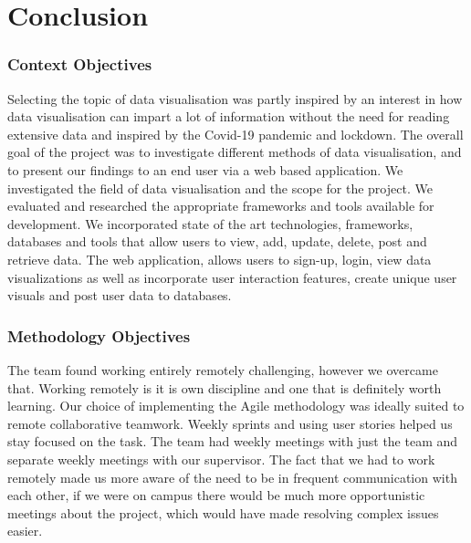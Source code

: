 \chapter{Conclusion}

\subsection{Context Objectives }
Selecting the topic of data visualisation was partly inspired by an interest in how data visualisation can impart a lot of information without the need for reading extensive data and inspired by the Covid-19 pandemic and lockdown.
The overall goal of the project was to investigate different methods of data visualisation, and to present our findings to an end user via a web based application.
We investigated the field of data visualisation and the scope for the project.
We evaluated and researched the appropriate frameworks and tools available for development.
We incorporated state of the art technologies, frameworks, databases and tools that allow users to view, add, update, delete, post and retrieve data.
The web application, allows users to sign-up, login, view data visualizations as well as incorporate user interaction features, create unique user visuals and post user data to databases.




\subsection{Methodology Objectives}
The team found working entirely remotely challenging, however we overcame that. Working remotely is it is own discipline and one that is definitely worth learning. Our choice of implementing the Agile methodology was ideally suited to remote collaborative teamwork. Weekly sprints and using user stories helped us stay focused on the task. The team had weekly meetings with just the team and separate weekly meetings with our supervisor. The fact that we had to work remotely made us more aware of the need to be in frequent communication with each other, if we were on campus there would be much more opportunistic meetings about the project, which would have made resolving complex issues easier. 

